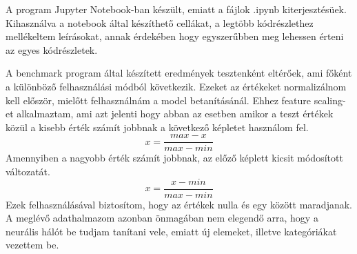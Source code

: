 
A program Jupyter Notebook-ban készült, emiatt a fájlok .ipynb kiterjesztésüek. Kihasználva a notebook által készíthető cellákat, a legtöbb kódrészlethez mellékeltem leírásokat, annak érdekében hogy egyszerűbben meg lehessen érteni az egyes kódrészletek.

A benchmark program által készített eredmények tesztenként eltérőek, ami főként a különböző felhasználási módból következik. Ezeket az értékeket normalizálnom kell először, mielőtt felhasználnám a model betanításánál. Ehhez feature scaling-et alkalmaztam, ami azt jelenti hogy abban az esetben amikor a teszt értékek közül a kisebb érték számít jobbnak a következő képletet használom fel. 
\begin{equation}
x = \frac{max-x}{max-min}
\end{equation}
Amennyiben a nagyobb érték számít jobbnak, az előző képlett kicsit módosított változatát.
\begin{equation}
x = \frac{x-min}{max-min}
\end{equation}
Ezek felhasználásával biztosítom, hogy az értékek nulla és egy között maradjanak.
A meglévő adathalmazom azonban önmagában nem elegendő arra, hogy a neurális hálót be tudjam tanítani vele, emiatt új elemeket, illetve kategóriákat vezettem be.
